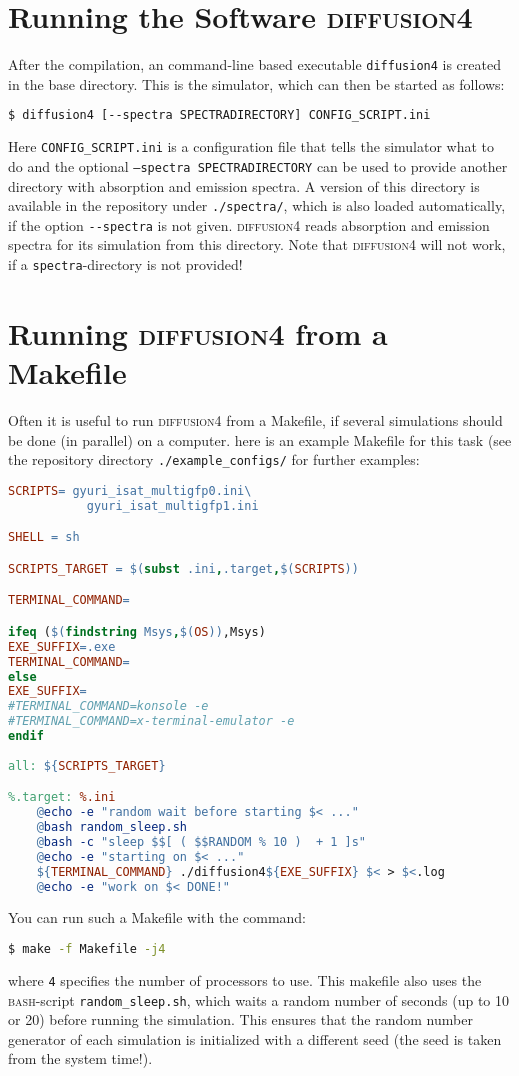 \documentclass[a4paper,twoside,10pt]{report}
\newcommand{\df}{\textsc{diffusion4}\xspace}
\newcommand{\bash}{\textsc{bash}\xspace}
\begin{document}
\section{Running the Software \df}
\label{sec:RunningTheSoftware}
After the compilation, an command-line based executable \texttt{diffusion4} is created in the base directory. This is the simulator, which can then be started as follows:
\begin{lstlisting}[language=bash] 
$ diffusion4 [--spectra SPECTRADIRECTORY] CONFIG_SCRIPT.ini 
\end{lstlisting}
Here \texttt{CONFIG\_SCRIPT.ini} is a configuration file that tells the simulator what to do and the optional \texttt{--spectra SPECTRADIRECTORY} can be used to provide another directory with absorption and emission spectra. A version of this directory is available in the repository under \verb!./spectra/!, which is also loaded automatically, if the option \verb!--spectra! is not given. \df reads absorption and emission spectra for its simulation from this directory. Note that \df will not work, if a \texttt{spectra}-directory is not provided!

\section{Running \df from a Makefile}
\label{sec:RunningDfFromAMakefile}
Often it is useful to run \df from a Makefile, if several simulations should be done (in parallel) on a computer. here is an example Makefile for this task (see the repository directory \texttt{./example\_configs/} for further examples:
\begin{lstlisting}[language=make] 
SCRIPTS= gyuri_isat_multigfp0.ini\
	       gyuri_isat_multigfp1.ini 

SHELL = sh

SCRIPTS_TARGET = $(subst .ini,.target,$(SCRIPTS))

TERMINAL_COMMAND=		

ifeq ($(findstring Msys,$(OS)),Msys)
EXE_SUFFIX=.exe
TERMINAL_COMMAND=
else
EXE_SUFFIX=
#TERMINAL_COMMAND=konsole -e 
#TERMINAL_COMMAND=x-terminal-emulator -e 
endif		
		 
all: ${SCRIPTS_TARGET}

%.target: %.ini
	@echo -e "random wait before starting $< ..."
	@bash random_sleep.sh
	@bash -c "sleep $$[ ( $$RANDOM % 10 )  + 1 ]s"
	@echo -e "starting on $< ..."
	${TERMINAL_COMMAND} ./diffusion4${EXE_SUFFIX} $< > $<.log
	@echo -e "work on $< DONE!"
\end{lstlisting}
You can run such a Makefile with the command:
\begin{lstlisting}[language=bash] 
$ make -f Makefile -j4
\end{lstlisting}
where \texttt{4} specifies the number of processors to use. This makefile also uses the \bash-script \texttt{random\_sleep.sh}, which waits a random number of seconds (up to 10 or 20) before running  the simulation. This ensures that the random number generator of each simulation is initialized with a different seed (the seed is taken from the system time!).
\end{document}
